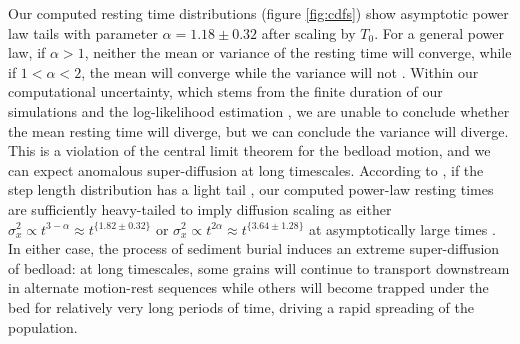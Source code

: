 \documentclass[draft]{agujournal2018}
\begin{document}
Our computed resting time distributions (figure \ref{fig:cdfs}) show asymptotic power law tails with parameter $\alpha = 1.18 \pm 0.32$ after scaling by $T_0$.
For a general power law, if $\alpha>1$, neither the mean or variance of the resting time will converge, while if $1<\alpha <2$, the mean will converge while the variance will not \citep[e.g.][]{Bradley2017}.
Within our computational uncertainty, which stems from the finite duration of our simulations and the log-likelihood estimation \citep[e.g.][]{Newman2005}, we are unable to conclude whether the mean resting time will diverge, but we can conclude the variance will diverge.
This is a violation of the central limit theorem for the bedload motion, and we can expect anomalous super-diffusion at long timescales.
According to \citet{Weeks1998}, if the step length distribution has a light tail \citep[e.g.][]{Hassan2013}, our computed power-law resting times are sufficiently heavy-tailed to imply diffusion scaling as either $\sigma_x^2 \propto t^{3-\alpha} \approx t^{\{1.82 \pm 0.32 \}}$ or $\sigma_x^2 \propto t^{2\alpha} \approx t^{\{3.64\pm 1.28\}}$ at asymptotically large times \citep[e.g.][]{Bradley2017}.
In either case, the process of sediment burial induces an extreme super-diffusion of bedload: at long timescales, some grains will continue to transport downstream in alternate motion-rest sequences while others will become trapped under the bed for relatively very long periods of time, driving a rapid spreading of the population.
\end{document}
